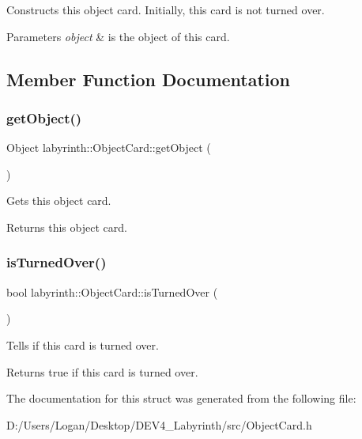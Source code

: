 Constructs this object card. Initially, this card is not turned over. 


\begin{DoxyParams}{Parameters}
{\em object} & is the object of this card. \\
\hline
\end{DoxyParams}


\subsection{Member Function Documentation}
\mbox{\label{structlabyrinth_1_1_object_card_a50df49093ec7c8ffa46b5d5c3fc85562}} 
\subsubsection{\texorpdfstring{getObject()}{getObject()}}
{\footnotesize\ttfamily Object labyrinth\+::\+Object\+Card\+::get\+Object (\begin{DoxyParamCaption}{ }\end{DoxyParamCaption})\hspace{0.3cm}{\ttfamily [inline]}}



Gets this object card. 

\begin{DoxyReturn}{Returns}
this object card. 
\end{DoxyReturn}
\mbox{\label{structlabyrinth_1_1_object_card_a488afb4284b53eba66780a67863cef41}} 
\subsubsection{\texorpdfstring{isTurnedOver()}{isTurnedOver()}}
{\footnotesize\ttfamily bool labyrinth\+::\+Object\+Card\+::is\+Turned\+Over (\begin{DoxyParamCaption}{ }\end{DoxyParamCaption})\hspace{0.3cm}{\ttfamily [inline]}}



Tells if this card is turned over. 

\begin{DoxyReturn}{Returns}
true if this card is turned over. 
\end{DoxyReturn}


The documentation for this struct was generated from the following file\+:\begin{DoxyCompactItemize}
\item 
D\+:/\+Users/\+Logan/\+Desktop/\+D\+E\+V4\+\_\+\+Labyrinth/src/Object\+Card.\+h\end{DoxyCompactItemize}
